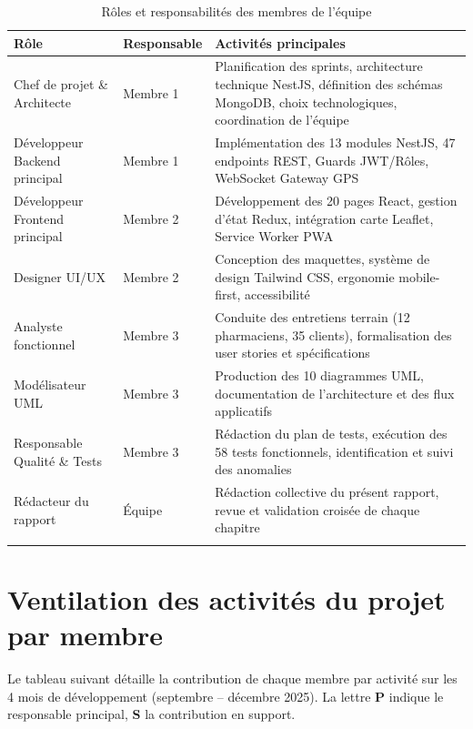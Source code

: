 \documentclass[12pt,a4paper,oneside]{report}
\begin{document}
\begin{longtable}{L{4.5cm}L{3.5cm}L{6.5cm}}
  \toprule
  \textbf{Rôle} & \textbf{Responsable} & \textbf{Activités principales} \\
  \midrule
  Chef de projet \& Architecte & Membre 1 & Planification des sprints, architecture technique NestJS, définition des schémas MongoDB, choix technologiques, coordination de l'équipe \\
  \midrule
  Développeur Backend principal & Membre 1 & Implémentation des 13 modules NestJS, 47 endpoints REST, Guards JWT/Rôles, WebSocket Gateway GPS \\
  \midrule
  Développeur Frontend principal & Membre 2 & Développement des 20 pages React, gestion d'état Redux, intégration carte Leaflet, Service Worker PWA \\
  \midrule
  Designer UI/UX & Membre 2 & Conception des maquettes, système de design Tailwind CSS, ergonomie mobile-first, accessibilité \\
  \midrule
  Analyste fonctionnel & Membre 3 & Conduite des entretiens terrain (12 pharmaciens, 35 clients), formalisation des user stories et spécifications \\
  \midrule
  Modélisateur UML & Membre 3 & Production des 10 diagrammes UML, documentation de l'architecture et des flux applicatifs \\
  \midrule
  Responsable Qualité \& Tests & Membre 3 & Rédaction du plan de tests, exécution des 58 tests fonctionnels, identification et suivi des anomalies \\
  \midrule
  Rédacteur du rapport & Équipe & Rédaction collective du présent rapport, revue et validation croisée de chaque chapitre \\
  \bottomrule
  \caption{Rôles et responsabilités des membres de l'équipe}
\end{longtable}

\section{Ventilation des activités du projet par membre}

Le tableau suivant détaille la contribution de chaque membre par activité sur les 4 mois de développement (septembre -- décembre 2025). La lettre \textbf{P} indique le responsable principal, \textbf{S} la contribution en support.
\end{document}
